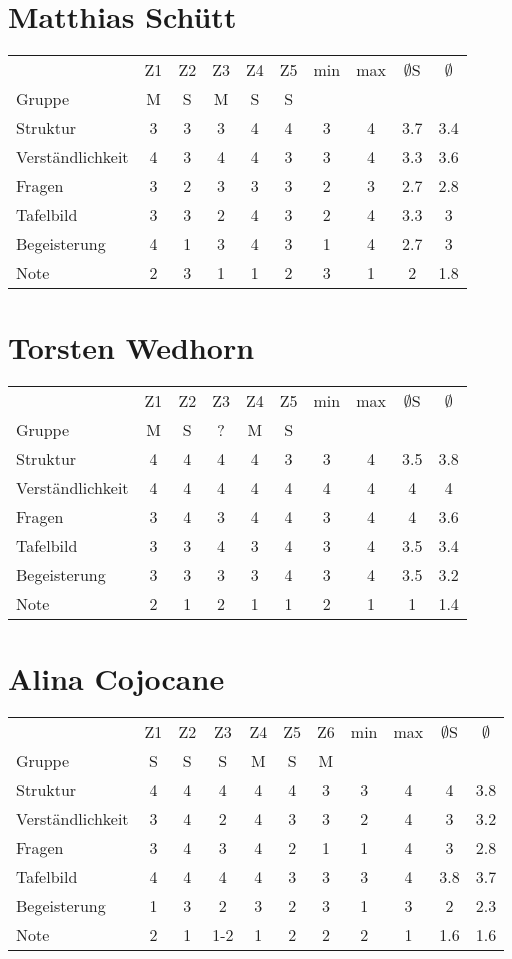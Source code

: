\documentclass[a4paper]{article}
\begin{document}
\section{Matthias Sch\"utt}
\begin{tabular}{l|ccccc|cc|cc}
&Z1&Z2&Z3&Z4&Z5&min&max&$\emptyset$S&$\emptyset$\\
Gruppe               &M&S&M&S&S&&&&\\
\hline
Struktur             &3&3&3&4&4&3&4&3.7&3.4\\
Verst\"andlichkeit   &4&3&4&4&3&3&4&3.3&3.6\\
Fragen               &3&2&3&3&3&2&3&2.7&2.8\\
Tafelbild            &3&3&2&4&3&2&4&3.3&3\\
Begeisterung         &4&1&3&4&3&1&4&2.7&3\\
\hline
Note                 &2&3&1&1&2&3&1&2&1.8
\end{tabular}

\section{Torsten Wedhorn}
\begin{tabular}{l|ccccc|cc|cc}
&Z1&Z2&Z3&Z4&Z5&min&max&$\emptyset$S&$\emptyset$\\
Gruppe               &M&S&?&M&S&&&&\\
\hline
Struktur             &4&4&4&4&3&3&4&3.5&3.8\\
Verst\"andlichkeit   &4&4&4&4&4&4&4&4&4\\
Fragen               &3&4&3&4&4&3&4&4&3.6\\
Tafelbild            &3&3&4&3&4&3&4&3.5&3.4\\
Begeisterung         &3&3&3&3&4&3&4&3.5&3.2\\
\hline
Note                 &2&1&2&1&1&2&1&1&1.4
\end{tabular}

\section{Alina Cojocane}
\begin{tabular}{l|cccccc|cc|cc}
&Z1&Z2&Z3&Z4&Z5&Z6&min&max&$\emptyset$S&$\emptyset$\\
Gruppe               &S&S&S&M&S&M&&&&\\
\hline
Struktur             &4&4&4&4&4&3&3&4&4&3.8\\
Verst\"andlichkeit   &3&4&2&4&3&3&2&4&3&3.2\\
Fragen               &3&4&3&4&2&1&1&4&3&2.8\\
Tafelbild            &4&4&4&4&3&3&3&4&3.8&3.7\\
Begeisterung         &1&3&2&3&2&3&1&3&2&2.3\\
\hline
Note                 &2&1&1-2&1&2&2&2&1&1.6&1.6
\end{tabular}
\end{document}
